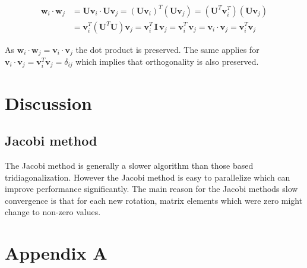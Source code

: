 \documentclass[a4paper, fontsize=11pt]{article}
\begin{document}
\begin{align*}
\textbf{w}_{i} \cdot \textbf{w}_{j} & =\textbf{U} \textbf{v}_{i} \cdot \textbf{U} \textbf{v}_{j} = (\textbf{U}\textbf{v}_{i})^{T}(\textbf{U}\textbf{v}_{j})=(\textbf{U}^{T} \textbf{v}_{i}^{T})(\textbf{U}\textbf{v}_{j})\\
&= \textbf{v}_{i}^{T} (\textbf{U}^{T} \textbf{U}) \textbf{v}_{j}= \textbf{v}_{i}^{T} \, \textbf{I} \, \textbf{v}_{j} =  \textbf{v}_{i}^{T} \,  \textbf{v}_{j} = \textbf{v}_{i} \cdot \textbf{v}_{j} = \textbf{v}^T_{i} \textbf{v}_{j}
\end{align*}

As $\textbf{w}_{i} \cdot \textbf{w}_{j} = \textbf{v}_{i} \cdot \textbf{v}_{j}$ the dot product is preserved. The same applies for $\textbf{v}_{i} \cdot \textbf{v}_{j} = \textbf{v}^T_{i} \textbf{v}_{j} = \delta_{ij}$ which implies that orthogonality is also preserved.



\section{Discussion}
\subsection{Jacobi method}
The Jacobi method is generally a slower algorithm than those based tridiagonalization. However the Jacobi method is easy to parallelize which can improve performance significantly. The main reason for the Jacobi methods slow convergence is that for each new rotation, matrix elements which were zero might change to non-zero values.


\section{Appendix A}

\newpage


\end{document}
